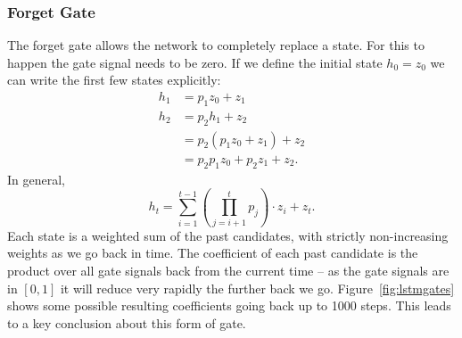 \subsubsection{Forget Gate}
The forget gate allows the network to completely replace a state.
For this to happen the gate signal needs to be zero. If we define the initial
state \(h_0 = z_0\) we can write the first few states explicitly:
\begin{align}
	h_1 &= p_1z_0 + z_1 \\
	h_2 &= p_2h_1 + z_2 \\
		&= p_2(p_1z_0 + z_1) + z_2 \\
		&= p_2p_1z_0 + p_2z_1 + z_2.
\end{align} In general,
\begin{equation}
	h_t = \sum_{i=1}^{t-1} \left(\prod_{j=i+1}^t p_j\right) \cdot z_i + z_t.
\end{equation} Each state is a weighted sum of the past candidates, with strictly
non-increasing weights as we go back in time.
The coefficient of each past candidate is the product over all gate signals back from the
current time -- as the gate signals are in \([0, 1]\) it will reduce very rapidly the further
back we go.
Figure~\ref{fig:lstmgates} shows some possible resulting coefficients going back up to 1000 steps.
This leads to a key conclusion about this form of gate.

